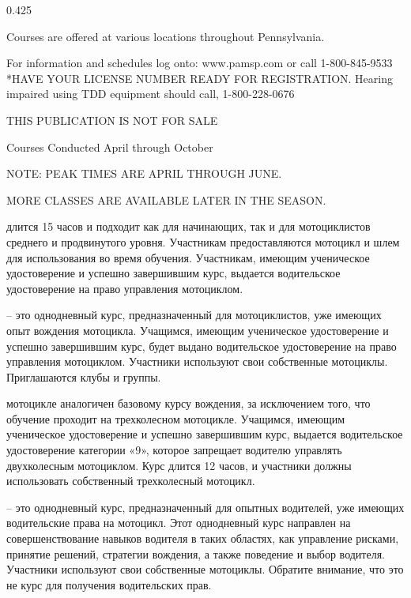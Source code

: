 \begin{langblock}{0.425}
\begin{eng}
	
	Courses are offered at various locations throughout Pennsylvania.
	
	
	For information and schedules log onto: www.pamsp.com or call 1-800-845-9533 *HAVE YOUR LICENSE NUMBER READY FOR REGISTRATION.  Hearing impaired using TDD equipment should call, 1-800-228-0676
	
	
	
	THIS PUBLICATION IS NOT FOR SALE
	
	Courses Conducted April through October
	
	NOTE: PEAK TIMES ARE APRIL THROUGH JUNE. 
	
	MORE CLASSES ARE AVAILABLE LATER IN THE SEASON.
	\end{eng}
	\begin{rus}
		
		\begin{description}[leftmargin=*]
		\item[«Basic Rider Course»] длится 15 часов и подходит как для начинающих, так и для мотоциклистов среднего и продвинутого уровня. Участникам предоставляются мотоцикл и шлем для использования во время обучения. Участникам, имеющим ученическое удостоверение и успешно завершившим курс, выдается водительское удостоверение на право управления мотоциклом.
		 
		\item[«Basic Rider Course 2»] -- это однодневный курс, предназначенный для мотоциклистов, уже имеющих опыт вождения мотоцикла. Учащимся, имеющим ученическое удостоверение и успешно завершившим курс, будет выдано водительское удостоверение на право управления мотоциклом.  Участники используют свои собственные мотоциклы. Приглашаются клубы и группы.
		
		 
		\item[BRC на 3-х колесном] мотоцикле аналогичен базовому курсу вождения, за исключением того, что обучение проходит на трехколесном мотоцикле. Учащимся, имеющим ученическое удостоверение и успешно завершившим курс, выдается водительское удостоверение категории «9», которое запрещает водителю управлять двухколесным мотоциклом. Курс длится 12 часов, и участники должны использовать собственный трехколесный мотоцикл.
		 
		
		\item[«Advanced Rider Course»] -- это однодневный курс, предназначенный для опытных водителей, уже имеющих водительские права на мотоцикл. Этот однодневный курс направлен на совершенствование навыков водителя в таких областях, как управление рисками, принятие решений, стратегии вождения, а также поведение и выбор водителя. Участники используют свои собственные мотоциклы. Обратите внимание, что это не курс для получения водительских прав.
		\end{description}
		

\end{rus}
\end{langblock}
